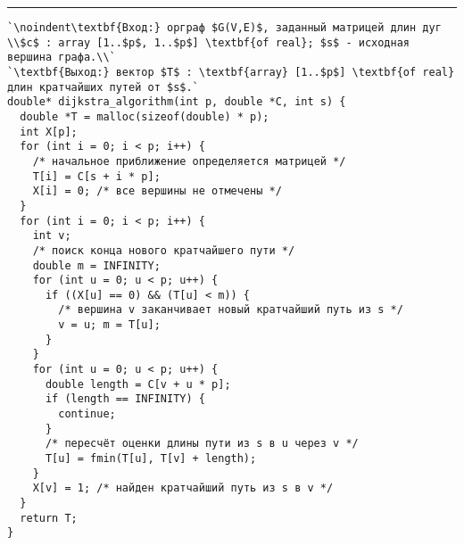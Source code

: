 \vspace{5pt} \hrule
\begin{lstlisting}[caption={Алгоритм Дейкстры}, label=p286_dijkstra_1, escapechar=`]
`\noindent\textbf{Вход:} орграф $G(V,E)$, заданный матрицей длин дуг \\$c$ : array [1..$p$, 1..$p$] \textbf{of real}; $s$ - исходная вершина графа.\\`
`\textbf{Выход:} вектор $T$ : \textbf{array} [1..$p$] \textbf{of real} длин кратчайших путей от $s$.`
double* dijkstra_algorithm(int p, double *C, int s) {
  double *T = malloc(sizeof(double) * p);
  int X[p];
  for (int i = 0; i < p; i++) {
    /* начальное приближение определяется матрицей */
    T[i] = C[s + i * p];
    X[i] = 0; /* все вершины не отмечены */
  }
  for (int i = 0; i < p; i++) {
    int v;
    /* поиск конца нового кратчайшего пути */
    double m = INFINITY;
    for (int u = 0; u < p; u++) {
      if ((X[u] == 0) && (T[u] < m)) {
        /* вершина v заканчивает новый кратчайший путь из s */
        v = u; m = T[u];
      }
    }
    for (int u = 0; u < p; u++) {
      double length = C[v + u * p];
      if (length == INFINITY) {
        continue;
      }
      /* пересчёт оценки длины пути из s в u через v */
      T[u] = fmin(T[u], T[v] + length);
    }
    X[v] = 1; /* найден кратчайший путь из s в v */
  }
  return T;
}
\end{lstlisting}
